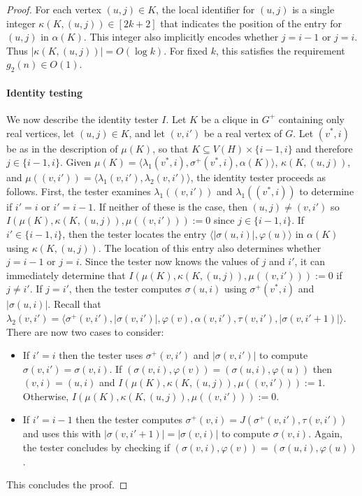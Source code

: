 \documentclass{patmorin}
\newcommand{\Oh}{O}
\begin{document}
\begin{proof}
    For each vertex $(u,j)\in K$, the local identifier for $(u,j)$ is a single integer $\kappa(K,(u,j))\in[2k+2]$ that indicates the position of the entry for $(u,j)$ in $\alpha(K)$.  This integer also implicitly encodes whether $j=i-1$  or $j=i$.  Thus $|\kappa(K,(u,j))| = \Oh(\log k)$.  For fixed $k$, this satisfies the requirement $g_2(n)\in\Oh(1)$.

    \paragraph{Identity testing}

    We now describe the identity tester $I$.  Let $K$ be a clique in $G^+$ containing only real vertices, let $(u,j)\in K$, and let $(v,i')$ be a real vertex of $G$.  Let $(v^*,i)$ be as in the description of $\mu(K)$, so that $K\subseteq V(H)\times\{i-1,i\}$ and therefore $j\in\{i-1,i\}$.   Given $\mu(K)=\langle\lambda_1(v^*,i),\sigma^+(v^*,i),\alpha(K)\rangle$, $\kappa(K,(u,j))$, and $\mu((v,i'))=\langle \lambda_1(v,i'),\lambda_2(v,i')\rangle$, the identity tester proceeds as follows. First, the tester examines $\lambda_1((v,i'))$ and $\lambda_1((v^*,i))$ to determine if $i'=i$ or $i'=i-1$.  If neither of these is the case, then $(u,j)\neq (v,i')$ so $I(\mu(K),\kappa(K,(u,j)),\mu((v,i'))):=0$ since $j\in\{i-1,i\}$.
    If $i'\in\{i-1,i\}$, then the tester locates the entry $\langle |\sigma(u,i)|,\varphi(u)\rangle$ in $\alpha(K)$ using $\kappa(K,(u,j))$. The location of this entry also determines whether $j=i-1$ or $j=i$.  Since the tester now knows the values of $j$ and $i'$, it can immediately determine that $I(\mu(K),\kappa(K,(u,j)),\mu((v,i'))):=0$ if $j\neq i'$.
    If $j=i'$, then the tester computes $\sigma(u,i)$ using $\sigma^+(v^*,i)$ and $|\sigma(u,i)|$. Recall that $\lambda_2(v,i')=\langle \sigma^+(v,i'), |\sigma(v,i')|, \varphi(v),\alpha(v,i'),\tau(v,i'),|\sigma(v,i'+1)|\rangle$.
  There are now two cases to consider:
  \begin{itemize}
    \item If $i'=i$ then the tester uses $\sigma^+(v,i')$ and $|\sigma(v,i')|$ to compute $\sigma(v,i')=\sigma(v,i)$.  If $(\sigma(v,i),\varphi(v))=(\sigma(u,i),\varphi(u))$ then $(v,i)=(u,i)$ and  $I(\mu(K),\kappa(K,(u,j)),\mu((v,i'))):=1$.  Otherwise, $I(\mu(K),\kappa(K,(u,j)),\mu((v,i'))):=0$.
    \item If $i'=i-1$ then the tester computes $\sigma^+(v,i)=J(\sigma^+(v,i'),\tau(v,i'))$ and uses this with $|\sigma(v,i'+1)|=|\sigma(v,i)|$ to compute $\sigma(v,i)$.  Again, the tester concludes by checking if $(\sigma(v,i),\varphi(v))=(\sigma(u,i),\varphi(u))$.
  \end{itemize}
  This concludes the proof.
\end{proof}

 
\end{document}
